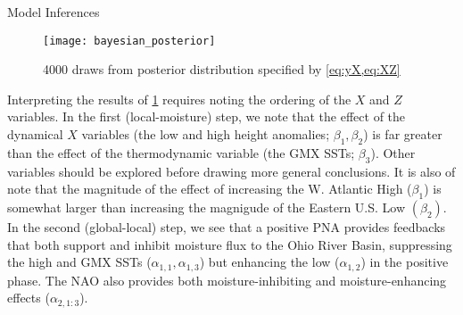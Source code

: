 \begin{block}{Model Inferences}
    \begin{figure}
        \centering
        \caption{\num{4000} draws from posterior distribution specified by \cref{eq:yX,eq:XZ}}
        \texttt{[image: bayesian\_posterior]}
        \label{fig:posterior}
    \end{figure}
    Interpreting the results of \cref{fig:posterior} requires noting the ordering of the $X$ and $Z$ variables.
    In the first (local-moisture) step, we note that the effect of the dynamical $X$ variables (the low and high height anomalies; $\beta_1, \beta_2$) is far greater than the effect of the thermodynamic variable (the GMX SSTs; $\beta_3$).
    Other variables should be explored before drawing more general conclusions.
    It is also of note that the magnitude of the effect of increasing the W. Atlantic High ($\beta_1$) is somewhat larger than increasing the magnigude of the Eastern U.S. Low $(\beta_2)$.
    In the second (global-local) step, we see that a positive PNA provides feedbacks that both support and inhibit moisture flux to the Ohio River Basin, suppressing the high and GMX SSTs ($\alpha_{1,1}, \alpha_{1,3}$) but enhancing the low ($\alpha_{1,2}$) in the positive phase.
    The NAO also provides both moisture-inhibiting and moisture-enhancing effects ($\alpha_{2,1:3}$).
\end{block}
